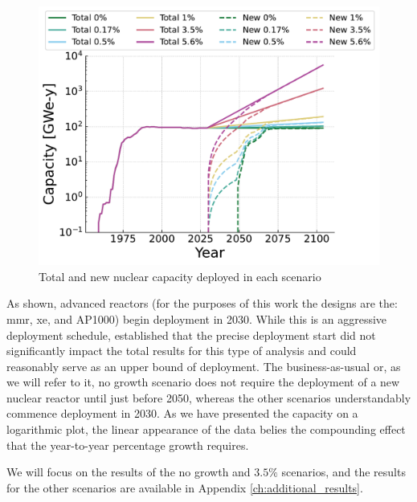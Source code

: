 \begin{figure}[H]
    \centering
    \includegraphics[scale=0.75]{images/results/deployment_calcs/total_new_capacity_scenarios.pdf}
    \caption{Total and new nuclear capacity deployed in each scenario}
    \label{fig:dep_goals}
\end{figure}

As shown, advanced reactors (for the purposes of this work the designs are the:
\gls{mmr}, \gls{xe}, and AP1000) begin deployment in 2030. While this is an
aggressive deployment schedule, \cite{bachmann_thesis_2023} established that
the precise deployment start did not significantly impact the total results for
this type of analysis and could reasonably serve as an upper bound of
deployment. The business-as-usual or, as we will refer to it, no growth
scenario does not require the deployment of a new nuclear reactor until just
before 2050, whereas the other scenarios understandably commence deployment in
2030. As we have presented the capacity on a logarithmic plot, the linear
appearance of the data belies the compounding effect that the year-to-year
percentage growth requires.

We will focus on the results of the no growth and $3.5\%$ scenarios, and the results for the other scenarios are available in Appendix \ref{ch:additional_results}.